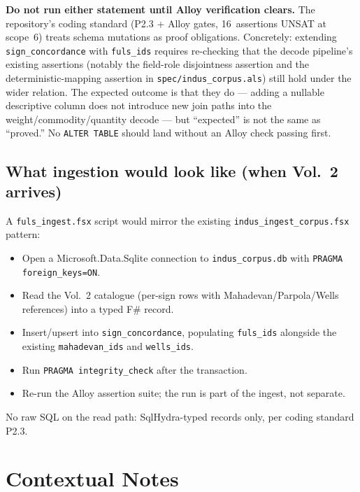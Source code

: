 \documentclass[12pt, a4paper]{article}
\newcommand{\db}[1]{\texttt{#1}}
\begin{document}
\begin{caveat}
\textbf{Do not run either statement until Alloy verification
clears.}\enspace
The repository's coding standard (P2.3 + Alloy gates,
16~assertions UNSAT at scope~6) treats schema mutations as
proof obligations.  Concretely: extending \db{sign\_concordance}
with \db{fuls\_ids} requires re-checking that the decode
pipeline's existing assertions (notably the field-role
disjointness assertion and the deterministic-mapping
assertion in \texttt{spec/indus\_corpus.als})
still hold under the wider relation.
The expected outcome is that they do --- adding a nullable
descriptive column does not introduce new join paths into the
weight/commodity/quantity decode --- but ``expected'' is not
the same as ``proved.''  No \db{ALTER TABLE} should land
without an Alloy check passing first.
\end{caveat}

\subsection{What ingestion would look like (when Vol.~2 arrives)}

A \texttt{fuls\_ingest.fsx} script would mirror the existing
\texttt{indus\_ingest\_corpus.fsx} pattern:

\begin{itemize}[leftmargin=1.6em, itemsep=2pt]
\item Open a Microsoft.Data.Sqlite connection to
      \db{indus\_corpus.db} with \texttt{PRAGMA foreign\_keys=ON}.
\item Read the Vol.~2 catalogue (per-sign rows with
      Mahadevan/Parpola/Wells references) into a typed
      F\# record.
\item Insert/upsert into \db{sign\_concordance}, populating
      \db{fuls\_ids} alongside the existing
      \db{mahadevan\_ids} and \db{wells\_ids}.
\item Run \texttt{PRAGMA integrity\_check} after the
      transaction.
\item Re-run the Alloy assertion suite; the run is part of
      the ingest, not separate.
\end{itemize}

No raw SQL on the read path: SqlHydra-typed records only,
per coding standard P2.3.

\section{Contextual Notes}
\label{sec:notes}
\end{document}
